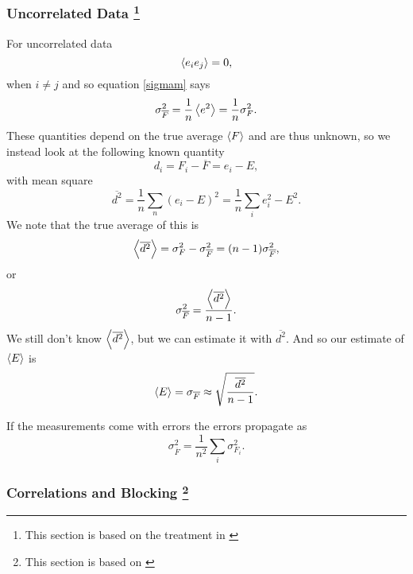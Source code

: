 \documentclass[a4paper,English,10pt]{article}
\newcommand{\be}{\begin{equation}}
\newcommand{\ee}{\end{equation}}
\newcommand{\f}{\frac}
\renewcommand{\bar}{\overline}
\renewcommand{\braket}{\Braket}
\begin{document}
\subsubsection[Uncorrelated Data]{Uncorrelated Data \footnote{This section is based on the treatment in \cite{errors}}}
For uncorrelated data
\be
 \braket{e_i e_j} = 0,
\ee
when $i\neq j$
and so equation \ref{sigmam} says
\be
\sigma^2_{\bar{F}} = \f{1}{n}\braket{e^2} = \f{1}{n}\sigma_F^2.
\ee
These quantities depend on the true average $\braket{F}$ and are thus unknown, so we instead look at the following known quantity
\be
d_i = F_i - \bar{F} = e_i - E, \label{residualdef}
\ee
with mean square
\be
\bar{d^2} = \f{1}{n}\sum_n(e_i - E)^2 = \f{1}{n}\sum_i e_i^2 - E^2.
\ee
We note that the true average of this is
\be
\braket{\bar{d^2}} = \sigma_F^2 - \sigma_{\bar{F}}^2 = (n-1)\sigma_{\bar{F}}^2,
\ee
or
\be
\sigma_{\bar{F}}^2 = \f{\braket{\bar{d^2}}}{n-1}.
\ee
We still don't know $\braket{\bar{d^2}}$, but we can estimate it with $\bar{d^2}$. And so our estimate of $\braket{E}$ is
\be
\braket{E} = \sigma_{\bar{F}} \approx \sqrt{\f{\bar{d^2}}{n-1}}.\label{errorest}
\ee

If the measurements come with errors the errors propagate as
\be
\sigma^2_{\bar{F}} = \f{1}{n^2}\sum_i\sigma_{F_i}^2.\label{errprop}
\ee

\subsubsection[Correlations and Blocking]{Correlations and Blocking \footnote {This section is based on \cite{block} } }
\end{document}
